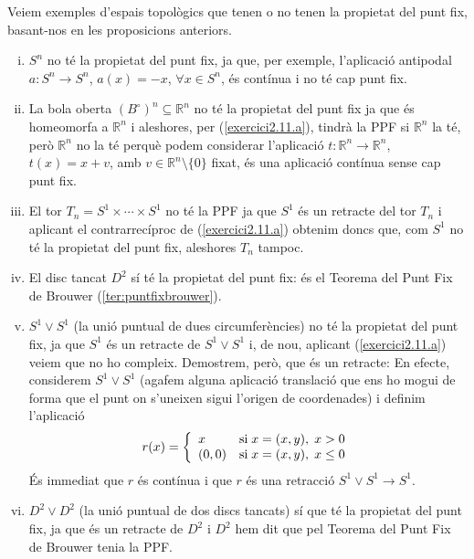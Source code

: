 \documentclass[../main.tex]{subfiles}
\begin{document}
\begin{ej}
[Exercici 11c]\label{exercici2.11.c} Veiem exemples d'espais topològics que tenen o no tenen la propietat del punt fix, basant-nos en les proposicions anteriors.
\begin{enumerate}[(i)]
    \item $S^n$ no té la propietat del punt fix, ja que, per exemple, l'aplicació antipodal $a:S^n\rightarrow S^n$, $a(x) = -x$, $\forall x\in S^n$, és contínua i no té cap punt fix.
    \item La bola oberta $(B^\circ)^n \subseteq \mathbb{R}^n$ no té la propietat del punt fix ja que és homeomorfa a $\mathbb{R}^n$ i aleshores, per (\ref{exercici2.11.a}), tindrà la PPF si $\mathbb{R}^n$ la té, però $\mathbb{R}^n$ no la té perquè podem considerar l'aplicació $t:\mathbb{R}^n\rightarrow \mathbb{R}^n$, $t(x) =x+v$, amb $v\in\mathbb{R}^n\setminus\{0\}$ fixat, és una aplicació contínua sense cap punt fix.
    \item El tor $T_n = S^1\times\cdots\times S^1$ no té la PPF ja que $S^1$ és un retracte del tor $T_n$ i aplicant el contrarrecíproc de (\ref{exercici2.11.a}) obtenim doncs que, com $S^1$ no té la propietat del punt fix, aleshores $T_n$ tampoc.
    \item El disc tancat $D^2$ sí té la propietat del punt fix: és el Teorema del Punt Fix de Brouwer (\ref{ter:puntfixbrouwer}).
    \item $S^1\vee S^1$ (la unió puntual de dues circumferències) no té la propietat del punt fix, ja que $S^1$ és un retracte de $S^1\vee S^1$ i, de nou, aplicant (\ref{exercici2.11.a}) veiem que no ho compleix. Demostrem, però, que és un retracte: En efecte, considerem $S^1\vee S^1$ (agafem alguna aplicació translació que ens ho mogui de forma que el punt on s'uneixen sigui l'origen de coordenades) i definim l'aplicació
    \begin{equation}
        \notag
        r(x) = \left\{
        \begin{array}{ll}
            x & \mathrm{si}\;x=(x,y),\;x>0 \\
            (0,0) & \mathrm{si}\;x=(x,y),\;x\leq 0
        \end{array}
        \right.
    \end{equation}
    És immediat que $r$ és contínua i que $r$ és una retracció $S^1\vee S^1\rightarrow S^1$.
    \item $D^2\vee D^2$ (la unió puntual de dos discs tancats) sí que té la propietat del punt fix, ja que és un retracte de $D^2$ i $D^2$ hem dit que pel Teorema del Punt Fix de Brouwer tenia la PPF.
\end{enumerate}
\end{ej}
\end{document}
